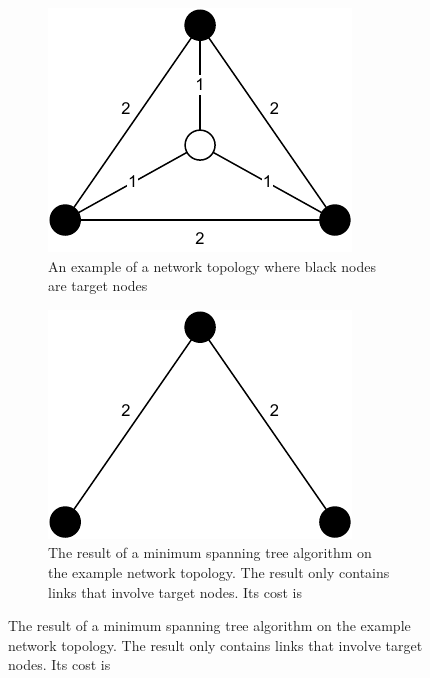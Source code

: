 \begin{figure}
	\centering
	\begin{subfigure}[b]{0.3\textwidth}
		\centering
		\includegraphics[width=\textwidth]{img/steiner-topology}
		\caption{An example of a network topology where black nodes are
		target nodes}\label{subfig:steiner-topology}
	\end{subfigure}
	\begin{subfigure}[b]{0.3\textwidth}
		\centering
		\includegraphics[width=\textwidth]{img/steiner-minspanning}
		\caption{The result of a minimum spanning tree algorithm on the
		example network topology. The result only contains links that
		involve target nodes. Its cost is
}
\end{subfigure}
\end{figure}
